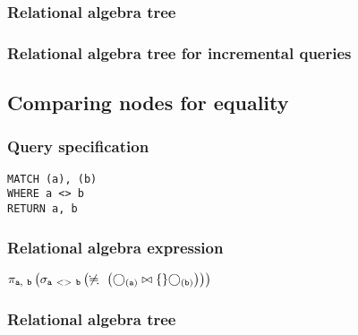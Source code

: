 \subsubsection*{Relational algebra tree}


\subsubsection*{Relational algebra tree for incremental queries}


\subsection{Comparing nodes for equality}

\subsubsection*{Query specification}

\begin{lstlisting}
MATCH (a), (b)
WHERE a <> b
RETURN a, b
\end{lstlisting}

\subsubsection*{Relational algebra expression}

$\projection{\var{a},~\var{b}} \left(\selection{\mathtt{a~<>~b}} \left(\alldifferent{} \left(\getvertices{a}{} \join \{\} \getvertices{b}{}\right)\right)\right)$

\subsubsection*{Relational algebra tree}

